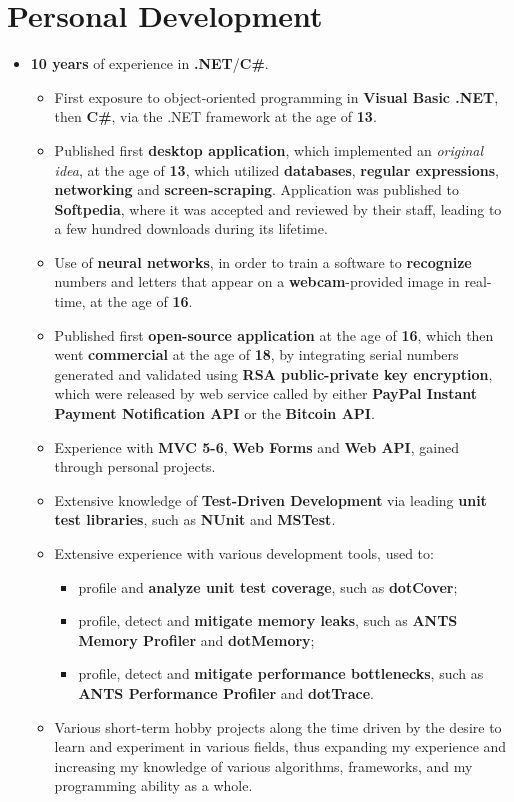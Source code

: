 \documentclass[11pt,a4paper,sans]{moderncv}
\begin{document}
\section{Personal Development}

	\begin{itemize}
	\item	\label{softdevcs}  \textbf{10 years} of experience in \textbf{.NET}/\textbf{C\#}.
		\begin{itemize}
		\item	First exposure to object-oriented programming in \textbf{Visual Basic .NET}, then \textbf{C\#}, via the .NET framework at the age of \textbf{13}.
		\item	Published first \textbf{desktop application}, which implemented an \textit{original idea}, at the age of \textbf{13}, which utilized \textbf{databases}, \textbf{regular expressions}, \textbf{networking} and \textbf{screen-scraping}. Application was published to \textbf{Softpedia}, where it was accepted and reviewed by their staff, leading to a few hundred downloads during its lifetime. 
		\item	Use of \textbf{neural networks}, in order to train a software to \textbf{recognize} numbers and letters that appear on a \textbf{webcam}-provided image in real-time, at the age of \textbf{16}.
		\item	Published first \textbf{open-source application} at the age of \textbf{16}, which then went \textbf{commercial} at the age of \textbf{18}, by integrating serial numbers generated and validated using \textbf{RSA public-private key encryption}, which were released by web service called by either \textbf{PayPal Instant Payment Notification API} or the \textbf{Bitcoin API}.
		\item	Experience with \textbf{MVC 5-6}, \textbf{Web Forms} and \textbf{Web API}, gained through personal projects.
		\item	Extensive knowledge of \textbf{Test-Driven Development} via leading \textbf{unit test libraries}, such as \textbf{NUnit} and \textbf{MSTest}.
		\item	Extensive experience with various development tools, used to:
			\begin{itemize}
			\item	profile and \textbf{analyze unit test coverage}, such as \textbf{dotCover};
			\item	profile, detect and \textbf{mitigate memory leaks}, such as \textbf{ANTS Memory Profiler} and \textbf{dotMemory};
			\item	profile, detect and \textbf{mitigate performance bottlenecks}, such as \textbf{ANTS Performance Profiler} and \textbf{dotTrace}.
			\end{itemize}
		\item	Various short-term hobby projects along the time driven by the desire to learn and experiment in various fields, thus expanding my experience and increasing my knowledge of various algorithms, frameworks, and my programming ability as a whole.
		\end{itemize}
	\end{itemize}
\end{document}
